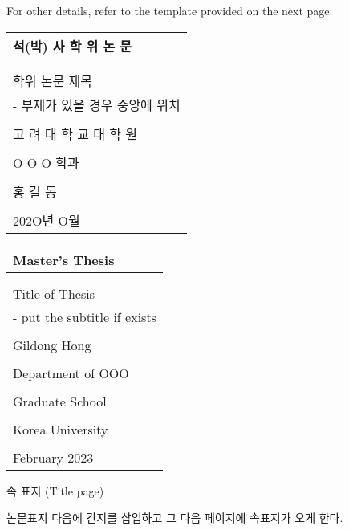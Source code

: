 \documentclass[11pt]{report}
\numberwithin{figure}{chapter}
\theoremstyle{plain}
\theoremstyle{definition}
\theoremstyle{corollary}
\theoremstyle{definition}
\theoremstyle{plain}
\theoremstyle{definition}
\theoremstyle{plain}
\begin{document}
For other details, refer to the template provided on the next page.


\newpage
\noindent
\begin{tabularx}{\textwidth}{| >{\centering\arraybackslash}X |}
\arrayrulecolor{blue}
\hline
\Large 석(박) 사 학 위 논 문 \\\hline
\rule{0pt}{60pt}\\\hline
\\[-15pt]
\huge 학위 논문 제목\\
\Large - 부제가 있을 경우 중앙에 위치\\
\rule{0pt}{180pt}\\\hline
\LARGE 고 려 대 학 교  대 학 원 \\\hline
\\[-8pt]\hline
\Large O O O 학과\\
\hline
\\[-8pt]\hline
\Large 홍 길 동\\\hline
\rule{0pt}{60pt}\\\hline
\large 202O년  O월 \\\hline
\end{tabularx}

\newpage
\noindent
\begin{tabularx}{\textwidth}{| >{\centering\arraybackslash}X |}
\arrayrulecolor{blue}
\hline
\Large Master's Thesis \\\hline
\rule{0pt}{60pt}\\\hline
\\[-15pt]
\huge Title of Thesis\\
\Large - put the subtitle if exists\\
\rule{0pt}{150pt}\\\hline
\Large Gildong Hong\\
\hline
\\[-8pt]\hline
\Large Department of OOO \\\hline
\rule{0pt}{30pt}\\\hline
\LARGE Graduate School \\\hline
\\[-8pt]\hline
\LARGE Korea University \\\hline
\rule{0pt}{20pt}\\\hline
\large February 2023 \\\hline
\end{tabularx}

\newpage
\begin{center}
\large 속 표지 (Title page)
\end{center}
논문표지 다음에 간지를 삽입하고 그 다음 페이지에 속표지가 오게 한다.
\end{document}
